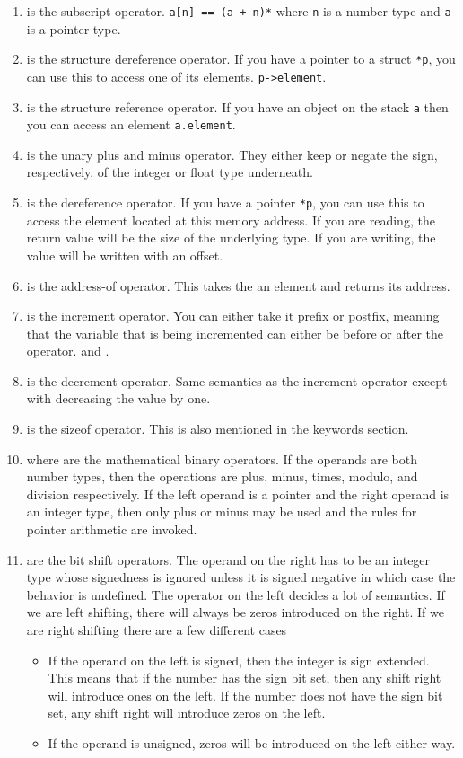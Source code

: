 \begin{enumerate}
	\item \keyword{[]} is the subscript operator. \texttt{a[n] == (a + n)*} where \texttt{n} is a number type and \texttt{a} is a pointer type.
	\item \keyword{->} is the structure dereference operator. If you have a pointer to a struct \texttt{*p}, you can use this to access one of its elements. \texttt{p->element}.
	\item {} is the structure reference operator. If you have an object on the stack \texttt{a} then you can access an element \texttt{a.element}.
	\item {} is the unary plus and minus operator. They either keep or negate the sign, respectively, of the integer or float type underneath.
	\item {} is the dereference operator. If you have a pointer  \texttt{*p}, you can use this to access the element located at this memory address. If you are reading, the return value will be the size of the underlying type. If you are writing, the value will be written with an offset.
	\item {} is the address-of operator. This takes the an element and returns its address.
	\item \keyword{++} is the increment operator. You can either take it prefix or postfix, meaning that the variable that is being incremented can either be before or after the operator.  and .
	\item \keyword{--} is the decrement operator. Same semantics as the increment operator except with decreasing the value by one.
	\item {} is the sizeof operator. This is also mentioned in the keywords section.
	\item {} where  are the mathematical binary operators. If the operands are both number types, then the operations are plus, minus, times, modulo, and division respectively. If the left operand is a pointer and the right operand is an integer type, then only plus or minus may be used and the rules for pointer arithmetic are invoked.
	\item \keyword{>>/<<} are the bit shift operators. The operand on the right has to be an integer type whose signedness is ignored unless it is signed negative in which case the behavior is undefined. The operator on the left decides a lot of semantics. If we are left shifting, there will always be zeros introduced on the right. If we are right shifting there are a few different cases
	      \begin{itemize}
		      \item If the operand on the left is signed, then the integer is sign extended. This means that if the number has the sign bit set, then any shift right will introduce ones on the left. If the number does not have the sign bit set, any shift right will introduce zeros on the left.
		      \item If the operand is unsigned, zeros will be introduced on the left either way.
	      \end{itemize}


\end{enumerate}
